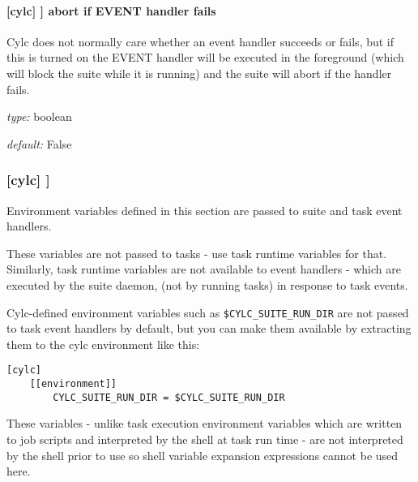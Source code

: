 \paragraph[abort if startup handler fails]{[cylc] \textrightarrow [[events]] \textrightarrow abort if EVENT handler fails}

Cylc does not normally care whether an event handler succeeds or fails,
but if this is turned on the EVENT handler will be executed in the
foreground (which will block the suite while it is running) and the
suite will abort if the handler fails.

\begin{myitemize}
    \item {\em type:} boolean
    \item {\em default:} False
\end{myitemize}

\subsubsection[{[[}environment{]]} ]{[cylc] \textrightarrow [[environment]]}

Environment variables defined in this section are passed to suite and
task event handlers.

\begin{myitemize}
    \item These variables are not passed to tasks - use task runtime
        variables for that. Similarly, task runtime variables are not
        available to event handlers - which are executed by the suite daemon,
        (not by running tasks) in response to task events.

    \item Cylc-defined environment variables such as
        \lstinline=$CYLC_SUITE_RUN_DIR= are not passed to task event
        handlers by default, but you can make them available by
        extracting them to the cylc environment like this:
\begin{lstlisting}
[cylc]
    [[environment]]
        CYLC_SUITE_RUN_DIR = $CYLC_SUITE_RUN_DIR
\end{lstlisting}

    \item These variables - unlike task execution environment variables
        which are written to job scripts and interpreted by the shell at
        task run time - are not interpreted by the shell prior to use
        so shell variable expansion expressions cannot be used here.
\end{myitemize}

